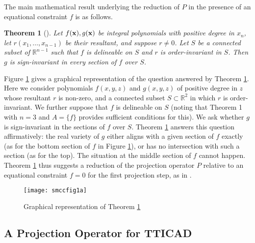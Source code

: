 \documentclass{article}
\newtheorem{theorem}{Theorem}
\begin{document}
The main mathematical result underlying the reduction of $P$ in the presence of an equational constraint $f$ is as follows.

\begin{theorem}[\cite{McCallum1999a}]\label{DJW:theorem:SMcCTheorem2}
Let $f({\bf x}), g({\bf x})$ be integral polynomials with positive degree in $x_n$, 
let $r(x_1,\ldots,x_{n-1})$ be their resultant, and suppose $r \neq 0$.
Let $S$ be a connected subset of $\mathbb{R}^{n-1}$
such that $f$ is delineable on $S$ and $r$ is order-invariant in $S$. 
Then $g$ is {\em sign-invariant} in every section of $f$ over $S$.
\end{theorem}

Figure \ref{fig:theorem2} gives a graphical representation of the question answered by Theorem \ref{DJW:theorem:SMcCTheorem2}.  Here we consider polynomials $f(x,y,z)$ and $g(x,y,z)$ of positive degree in $z$ whose resultant $r$ is non-zero, and a connected subset $S \subset \mathbb{R}^2$ in which $r$ is order-invariant.  We further suppose that $f$ is delineable on $S$ (noting that Theorem 1 with $n=3$ and $A = \{f\}$ provides sufficient conditions for this).  We ask whether $g$ is sign-invariant in the sections of $f$ over $S$.  Theorem \ref{DJW:theorem:SMcCTheorem2} answers this question affirmatively:  the real variety of $g$ either aligns with a given section of $f$ exactly (as for the bottom section of $f$ in Figure \ref{fig:theorem2}), or has no intersection with such a section (as for the top). The situation at the middle section of $f$ cannot happen.    
Theorem \ref{DJW:theorem:SMcCTheorem2} thus suggests a reduction of the projection operator $P$ relative to an equational constraint $f = 0$ for the first projection step, as in \cite{McCallum1999a}.

\begin{figure}
\caption{Graphical representation of Theorem \ref{DJW:theorem:SMcCTheorem2}}\label{fig:theorem2}
\begin{center}
\texttt{[image: smccfig1a]}
\end{center}
\vskip-10pt
\end{figure}

\subsection{A Projection Operator for TTICAD}
\label{subsec:ProjOper}
\end{document}

